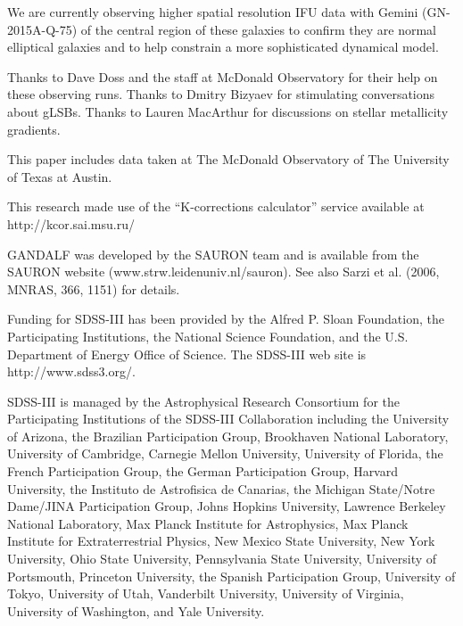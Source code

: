 \documentclass{emulateapj}
\begin{document}
We are currently observing higher spatial resolution IFU data with Gemini (GN-2015A-Q-75) of the central region of these galaxies to confirm they are normal elliptical galaxies and to help constrain a more sophisticated dynamical model.

\acknowledgments
Thanks to Dave Doss and the staff at McDonald Observatory for their help on these observing runs. Thanks to Dmitry Bizyaev for stimulating conversations about gLSBs. Thanks to Lauren MacArthur for discussions on stellar metallicity gradients.

This paper includes data taken at The McDonald Observatory of The University of Texas at Austin.


This research made use of the ``K-corrections calculator'' service available at http://kcor.sai.msu.ru/

GANDALF was developed by the SAURON team and is available from the SAURON website (www.strw.leidenuniv.nl/sauron). See also Sarzi et al. (2006, MNRAS, 366, 1151) for details.

Funding for SDSS-III has been provided by the Alfred P. Sloan Foundation, the Participating Institutions, the National Science Foundation, and the U.S. Department of Energy Office of Science. The SDSS-III web site is http://www.sdss3.org/.

SDSS-III is managed by the Astrophysical Research Consortium for the Participating Institutions of the SDSS-III Collaboration including the University of Arizona, the Brazilian Participation Group, Brookhaven National Laboratory, University of Cambridge, Carnegie Mellon University, University of Florida, the French Participation Group, the German Participation Group, Harvard University, the Instituto de Astrofisica de Canarias, the Michigan State/Notre Dame/JINA Participation Group, Johns Hopkins University, Lawrence Berkeley National Laboratory, Max Planck Institute for Astrophysics, Max Planck Institute for Extraterrestrial Physics, New Mexico State University, New York University, Ohio State University, Pennsylvania State University, University of Portsmouth, Princeton University, the Spanish Participation Group, University of Tokyo, University of Utah, Vanderbilt University, University of Virginia, University of Washington, and Yale University.
\end{document}
